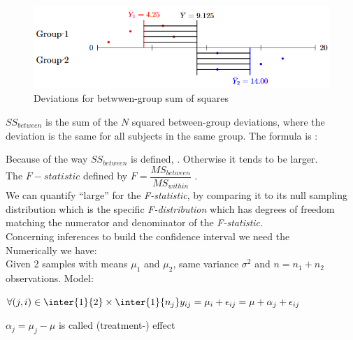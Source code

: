 \begin{figure}[H]
	\begin{center}
		\includegraphics[width=\textwidth]{./chapters/2_statistics/05_common_statistical_tests/2_images/2_anova_btw.PNG}
	\end{center}
	\caption{Deviations for betwwen-group sum of squares}
	\label{fig:4_anovaBtw}
\end{figure}
$SS_{between}$ is the sum of the $N$ squared between-group deviations, where the deviation is
the same for all subjects in the same group. The formula is : 
\begin{center}
\end{center}
Because of the way $SS_{between}$ is defined, . Otherwise it tends to be larger. \\
The $F-statistic$ defined by $F=\dfrac{MS_{between}}{MS_{within}}$ .\\

We can quantify ``large'' for the \emph{F-statistic}, by comparing it to its null sampling 
distribution which is the specific \emph{F-distribution}  which has degrees of freedom matching
the numerator and denominator of the \emph{F-statistic}.\\
Concerning inferences to build the confidence interval we need the \\

Numerically we have:\\
Given 2 samples with means $\mu_{1}$ and $\mu_{2}$, same variance $\sigma^{2}$ and $n=n_{1}+n_{2}$
observations.
Model: 
\begin{center}
	$\forall (j,i)\in\inter{1}{2}\times\inter{1}{n_{j}}y_{ij} = \mu_{i} + \epsilon_{ij} = \mu + \alpha_{j} + \epsilon_{ij}$
\end{center}
$\alpha_{j}=\mu_{j}-\mu$ is called (treatment-) effect

